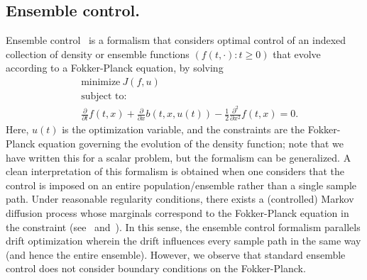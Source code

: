 \documentclass[11pt,leqno]{amsart}
\begin{document}
\subsection{Ensemble control.} Ensemble control~\citep{brockett,brockettb,Bartsch,MR3880221,Fleig} is a formalism that considers optimal control of an indexed collection of density  or ensemble functions $(f(t,\cdot): t \geq 0)$ that evolve according to a Fokker-Planck equation, by solving
\begin{align*}
    ~&\text{minimize}~J(f,u)\\
    ~&\text{subject to:}\\
    ~&\frac{\partial}{\partial t}f(t,x) + \frac{\partial}{\partial x}b(t,x,u(t)) -\frac{1}{2} \frac{\partial^2}{\partial x^2} f(t,x) = 0.
\end{align*}
Here, $u(t)$ is the optimization variable, and the constraints are the Fokker-Planck equation governing the evolution of the density function; note that we have written this for a scalar problem, but the formalism can be generalized. A clean interpretation of this formalism is obtained when one considers that the control is imposed on an entire population/ensemble rather than a single sample path. Under reasonable regularity conditions, there exists a (controlled) Markov diffusion process whose marginals correspond to the Fokker-Planck equation in the constraint (see~\citep{Mikami1999} and~\cite[Sec. 3.2.1]{MikamiBook}). In this sense, the ensemble control formalism parallels drift optimization wherein the drift influences every sample path in the same way (and hence the entire ensemble). However, we observe that standard ensemble control does not consider boundary conditions on the Fokker-Planck. 
\end{document}
